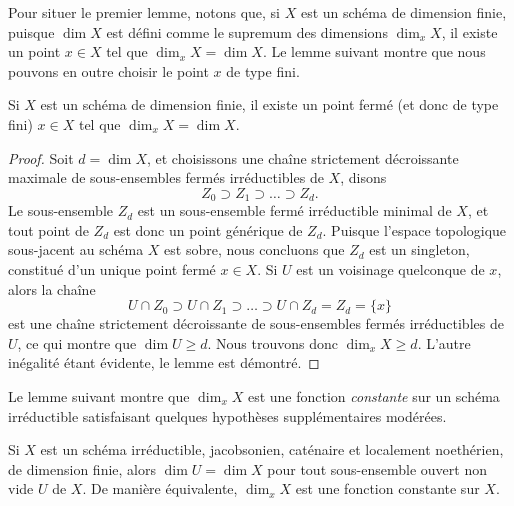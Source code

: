 \medskip\noindent
Pour situer le premier lemme,
notons que, si $X$ est un schéma de dimension finie, puisque $\dim X$
est défini comme le supremum des dimensions $\dim_x X$,
il existe un point $x \in X$ tel que $\dim_x X = \dim X$.
Le lemme suivant montre que nous pouvons en outre choisir le point
$x$ de type fini.

\begin{lemma}
\label{lemma-dimension-achieved-by-finite-type-point}
Si $X$ est un schéma de dimension finie,
il existe un point fermé (et donc de type fini) $x \in X$
tel que $\dim_x X = \dim X$.
\end{lemma}

\begin{proof}
Soit $d = \dim X$,
et choisissons une chaîne strictement décroissante maximale
de sous-ensembles fermés irréductibles de $X$,
disons
\begin{equation}
\label{equation-maximal-chain}
Z_0 \supset Z_1 \supset \ldots \supset Z_d.
\end{equation}
Le sous-ensemble $Z_d$ est un sous-ensemble fermé irréductible minimal de $X$,
et tout point de $Z_d$ est donc un point générique de $Z_d$.
Puisque l'espace topologique sous-jacent au schéma $X$ est sobre,
nous concluons que $Z_d$ est un singleton, constitué d'un unique
point fermé $x \in X$.
Si $U$ est
un voisinage quelconque de $x$, alors
la chaîne
$$
U\cap Z_0 \supset U\cap Z_1 \supset \ldots \supset U\cap Z_d = Z_d =
\{x\}
$$
est une chaîne strictement décroissante de sous-ensembles
fermés irréductibles de $U$, ce qui montre que $\dim U \geq d$.
Nous trouvons donc $\dim_x X \geq d$. L'autre inégalité
étant évidente, le lemme est démontré.
\end{proof}

\noindent
Le lemme suivant montre que $\dim_x X$ est une fonction {\it constante}
sur un schéma irréductible satisfaisant quelques hypothèses supplémentaires modérées.

\begin{lemma}
\label{lemma-constancy-of-dimension}
Si $X$ est un schéma irréductible, jacobsonien, caténaire et localement
noethérien, de dimension finie,
alors $\dim U = \dim X$ pour tout
sous-ensemble ouvert non vide $U$ de $X$.
De manière équivalente, $\dim_x X$ est une fonction constante sur $X$.
\end{lemma}

